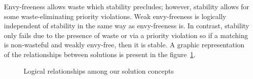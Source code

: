 Envy-freeness allows waste which stability precludes; however, stability allows for some waste-eliminating priority violations. Weak envy-freeness is logically independent of stability in the same way as envy-freeness is. In contrast, stability only fails due to the presence of waste or via a priority violation  so if a matching is non-wasteful and weakly envy-free, then it is stable.
A graphic representation of the relationships between solutions is present in the figure~\ref{fig:matching}.
\begin{figure}[!htb]
    \def\svgwidth{\columnwidth}
    
    \caption{Logical relationships among our solution concepts}
    \label{fig:matching}
\end{figure}

